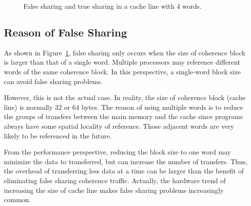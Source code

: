 \begin{figure}
\begin{center} 
%
\hspace{50pt}
%
\end{center}
\caption{False sharing and true sharing in a cache line with 4 words. }
\label{fig:fsexample}
\end{figure}


\subsection{Reason of False Sharing}

As shown in Figure~\ref{fig:fsexample}, false sharing only occurs when the size of coherence block is larger than that of a single word. Multiple processors may reference different words of the same coherence block. In this perspective, a single-word block size can avoid false sharing problems. 

However, this is not the actual case. In reality, the size of coherence block (cache line) is normally 32 or 64 bytes. The reason of using multiple words is to reduce the groups of transfers between the main memory and the cache since programs always have some spatial locality of reference. Those adjacent words are very likely to be referenced in the future.

From the performance perspective, reducing the block size to one word may minimize the data to transferred, but can increase the number of transfers. Thus, the overhead of transferring less data at a time can be larger than the benefit of eliminating false sharing coherence traffic. Actually, the hardware trend of increasing the size of cache line makes false sharing problems increasingly common. 

